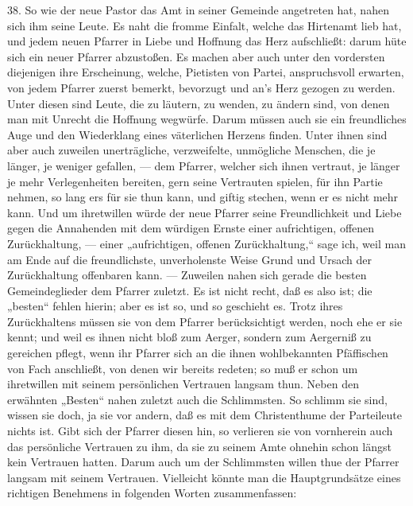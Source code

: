 38. So wie der neue Pastor das Amt in seiner Gemeinde angetreten hat, nahen sich ihm seine Leute. Es naht
die fromme Einfalt, welche das Hirtenamt lieb hat, und jedem neuen Pfarrer in Liebe und Hoffnung das Herz aufschließt: darum hüte sich ein neuer Pfarrer abzustoßen. Es machen aber auch unter den vordersten diejenigen ihre Erscheinung, welche, Pietisten von Partei, anspruchsvoll erwarten, von jedem Pfarrer zuerst bemerkt, bevorzugt und an’s Herz gezogen zu werden. Unter diesen sind Leute, die zu läutern, zu wenden, zu ändern sind, von denen man mit Unrecht die Hoffnung wegwürfe. Darum müssen auch sie ein freundliches Auge und den Wiederklang eines väterlichen Herzens finden. Unter ihnen sind aber auch zuweilen unerträgliche, verzweifelte, unmögliche Menschen, die je länger, je weniger gefallen, — dem Pfarrer, welcher sich ihnen vertraut, je länger je mehr Verlegenheiten bereiten, gern seine Vertrauten spielen, für ihn Partie nehmen, so lang ers für sie thun kann, und giftig stechen, wenn er es nicht mehr kann. Und um ihretwillen würde der neue Pfarrer seine Freundlichkeit und Liebe gegen die Annahenden mit dem würdigen Ernste einer aufrichtigen, offenen Zurückhaltung, — einer „aufrichtigen, offenen Zurückhaltung,“ sage ich, weil man am Ende auf die freundlichste, unverholenste Weise Grund und Ursach der Zurückhaltung offenbaren kann. — Zuweilen nahen sich gerade die besten Gemeindeglieder dem Pfarrer zuletzt. Es ist nicht recht, daß es also ist; die „besten“ fehlen hierin; aber es ist so, und so geschieht es. Trotz ihres Zurückhaltens müssen sie von dem Pfarrer berücksichtigt werden, noch ehe er sie kennt; und weil es ihnen nicht bloß zum Aerger, sondern zum Aergerniß zu gereichen pflegt, wenn ihr Pfarrer sich an die ihnen
wohlbekannten Pfäffischen von Fach anschließt, von denen wir bereits redeten; so muß er schon um ihretwillen mit seinem persönlichen Vertrauen langsam thun. Neben den erwähnten „Besten“ nahen zuletzt auch die Schlimmsten. So schlimm sie sind, wissen sie doch, ja sie vor andern, daß es mit dem Christenthume der Parteileute nichts ist. Gibt sich der Pfarrer diesen hin, so verlieren sie von vornherein auch das persönliche Vertrauen zu ihm, da sie zu seinem Amte ohnehin schon längst kein Vertrauen hatten. Darum auch um der Schlimmsten willen thue der Pfarrer langsam mit seinem Vertrauen. Vielleicht könnte man die Hauptgrundsätze eines richtigen Benehmens in folgenden Worten zusammenfassen:

